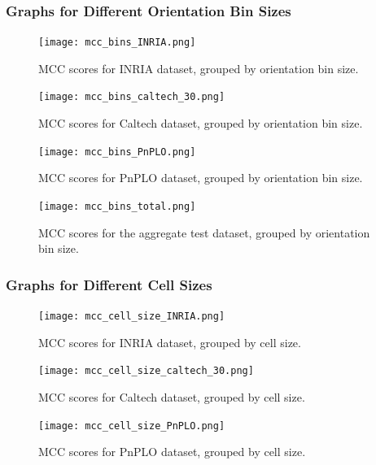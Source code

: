 \subsubsection{Graphs for Different Orientation Bin Sizes}

\begin{figure}
    \centering
    \texttt{[image: mcc\_bins\_INRIA.png]}
    \caption{
        MCC scores for INRIA dataset, grouped by orientation bin size.
    }
    \label{fig:orientation_bins_inria}
\end{figure}

\begin{figure}
    \centering
    \texttt{[image: mcc\_bins\_caltech\_30.png]}
    \caption{
        MCC scores for Caltech dataset, grouped by orientation bin size.
    }
\end{figure}

\begin{figure}
    \centering
    \texttt{[image: mcc\_bins\_PnPLO.png]}
    \caption{
        MCC scores for PnPLO dataset, grouped by orientation bin size.
    }
\end{figure}

\begin{figure}
    \centering
    \texttt{[image: mcc\_bins\_total.png]}
    \caption{
        MCC scores for the aggregate test dataset, grouped by orientation bin size.
    }
    \label{fig:orientation_bins_total}
\end{figure}


\subsubsection{Graphs for Different Cell Sizes}

\begin{figure}
    \centering
    \texttt{[image: mcc\_cell\_size\_INRIA.png]}
    \caption{
        MCC scores for INRIA dataset, grouped by cell size.
    }
\end{figure}

\begin{figure}
    \centering
    \texttt{[image: mcc\_cell\_size\_caltech\_30.png]}
    \caption{
        MCC scores for Caltech dataset, grouped by cell size.
    }
\end{figure}

\begin{figure}
    \centering
    \texttt{[image: mcc\_cell\_size\_PnPLO.png]}
    \caption{
        MCC scores for PnPLO dataset, grouped by cell size.
    }
\end{figure}


